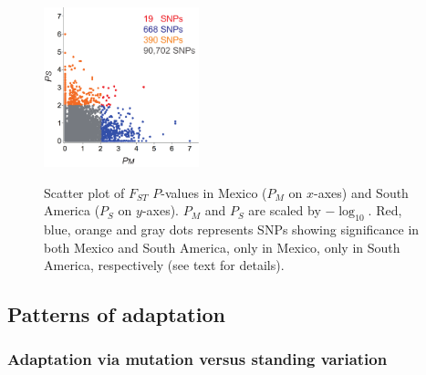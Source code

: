 \begin{figure}[tb]   
  \begin{center}
   \vspace{-0mm}
   \includegraphics[width=0.4\textwidth]{fig/Fig6}
   \renewcommand{\baselinestretch}{0.9}
   \vspace{-3mm}
   \caption{Scatter plot of $F_{ST}$ $P$-values in Mexico ($P_M$ on $x$-axes) and South America ($P_S$ on $y$-axes).  $P_M$ and $P_S$ are scaled by $-\log_{10}$.  
   Red, blue, orange and gray dots represents SNPs showing significance in both Mexico and South America, only in Mexico, only in South America, respectively (see text for details).} 
\vspace{-6mm}
    \label{PvDist}
  \end{center}
\end{figure}
%

\subsection*{Patterns of adaptation}

\subsubsection{Adaptation via mutation versus standing variation}


